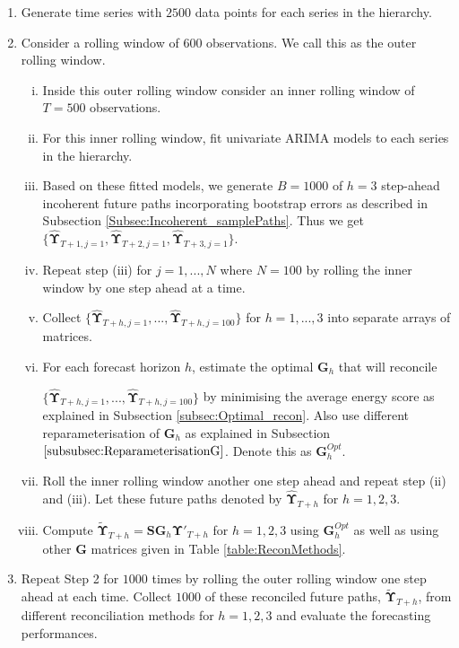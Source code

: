 \documentclass[12pt]{article}
\theoremstyle{definition}
\begin{document}
\begin{enumerate}
	\item Generate time series with $2500$ data points for each series in the hierarchy.
	 
	\item Consider a rolling window of $600$ observations. We call this as the outer rolling window. 
	\begin{enumerate}[i.]
		\item Inside this outer rolling window consider an inner rolling window of $T=500$ observations. 
		\item For this inner rolling window, fit univariate ARIMA models to each series in the hierarchy.
		\item Based on these fitted models, we generate $B=1000$ of $h=3$ step-ahead incoherent future paths incorporating bootstrap errors as described in Subsection \ref{Subsec:Incoherent_samplePaths}. Thus we get $\{\hat{\bm{\Upsilon}}_{T+1,j=1}, \hat{\bm{\Upsilon}}_{T+2,j=1}, \hat{\bm{\Upsilon}}_{T+3,j=1}\}$. 
		\item Repeat step (iii) for $j=1,...,N$ where $N=100$ by rolling the inner window by one step ahead at a time. 
		\item Collect $\{\hat{\bm{\Upsilon}}_{T+h,j=1},...,\hat{\bm{\Upsilon}}_{T+h,j=100}\}$ for $h=1,...,3$ into separate arrays of matrices. 
		\item For each forecast horizon $h$, estimate the optimal $\bm{G}_h$ that will reconcile
		
		$\{\hat{\bm{\Upsilon}}_{T+h,j=1},...,\hat{\bm{\Upsilon}}_{T+h,j=100}\}$ by minimising the average energy score as explained in Subsection \ref{subsec:Optimal_recon}. Also use different reparameterisation of $\bm{G}_h$ as explained in Subsection $\ref{subsubsec:ReparameterisationG}$. Denote this as $\bm{G}^{Opt}_h$. 
		\item Roll the inner rolling window another one step ahead and repeat step (ii) and (iii). Let these future paths denoted by $\hat{\bm{\Upsilon}}_{T+h}$ for $h=1,2,3$. 
		\item Compute $\tilde{\bm{\Upsilon}}_{T+h} = \bm{SG}_h\hat{\bm{\Upsilon}}'_{T+h}$ for $h=1,2,3$ using $\bm{G}^{Opt}_h$ as well as using other $\bm{G}$ matrices given in Table \ref{table:ReconMethods}.
		
	\end{enumerate}

	\item Repeat Step 2 for $1000$ times by rolling the outer rolling window one step ahead at each time. Collect $1000$ of these reconciled future paths, $\tilde{\bm{\Upsilon}}_{T+h}$, from different reconciliation methods for $h=1,2,3$ and evaluate the forecasting performances. 
\end{enumerate}
\end{document}
